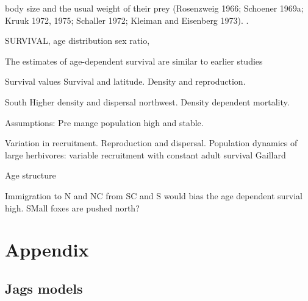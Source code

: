 \documentclass[12pt, a4paper]{article}
\begin{document}
body size and the usual weight of their prey (Rosenzweig 1966; Schoener 1969a; Kruuk 1972,
1975; Schaller 1972; Kleiman and Eisenberg 1973). \citep{gittlemanCarnivoreBodySize1985}. 



SURVIVAL, age distribution sex ratio, 

The estimates of age-dependent survival are similar to earlier studies 

Survival values
Survival and latitude. Density and reproduction. 

South  Higher density and dispersal northwest. Density dependent mortality. 


Assumptions: Pre mange population high and stable.  

Variation in recruitment. Reproduction and dispersal. Population dynamics of large herbivores: variable recruitment with constant adult survival Gaillard

Age structure \citep{yonedaEffectsHuntingAge1982} 

Immigration to N and NC from SC and S would bias the age dependent survial high. SMall foxes are pushed north?  

\newpage
\singlespacing
\printbibliography

\newpage
\section*{Appendix}

\subsection*{Jags models}
\end{document}
